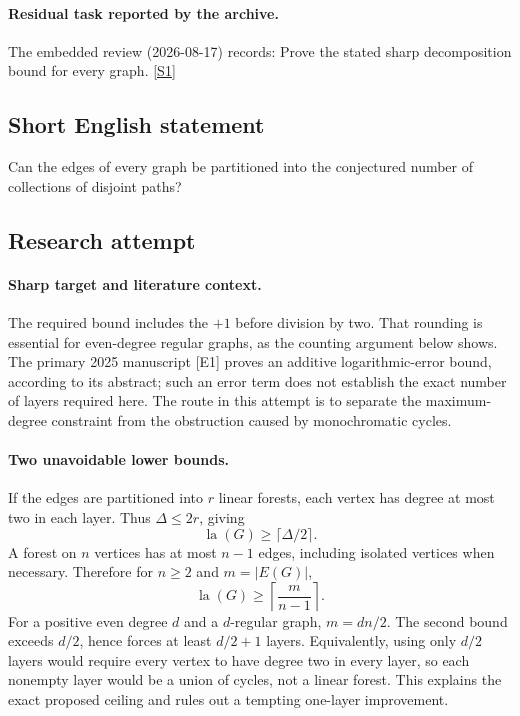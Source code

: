 \documentclass[11pt,a4paper]{article}
\newcommand{\sref}[2]{\hyperlink{source:#1:#2}{[S#2]}}
\begin{document}
\paragraph{Residual task reported by the archive.}

The embedded review (2026-08-17) records: Prove the stated sharp decomposition bound for every graph. \sref{1419}{1}

\subsection{Short English statement}

Can the edges of every graph be partitioned into the conjectured number of collections of disjoint paths?

\subsection{Research attempt}

\paragraph{Sharp target and literature context.}
The required bound includes the $+1$ before division by two. That
rounding is essential for even-degree regular graphs, as the counting
argument below shows. The primary 2025 manuscript [E1] proves an
additive logarithmic-error bound, according to its abstract; such an
error term does not establish the exact number of layers required here.
The route in this attempt is to separate the maximum-degree constraint
from the obstruction caused by monochromatic cycles.

\paragraph{Two unavoidable lower bounds.}
If the edges are partitioned into $r$ linear forests, each vertex has
degree at most two in each layer. Thus $\Delta\le2r$, giving
\[
                  \operatorname{la}(G)\ge\lceil\Delta/2\rceil.
\]
A forest on $n$ vertices has at most $n-1$ edges, including isolated
vertices when necessary. Therefore for $n\ge2$ and $m=|E(G)|$,
\[
                  \operatorname{la}(G)\ge\left\lceil\frac m{n-1}\right\rceil.
\]
For a positive even degree $d$ and a $d$-regular graph, $m=dn/2$.
The second bound exceeds $d/2$, hence forces at least $d/2+1$
layers. Equivalently, using only $d/2$ layers would require every
vertex to have degree two in every layer, so each nonempty layer
would be a union of cycles, not a linear forest. This explains the
exact proposed ceiling and rules out a tempting one-layer improvement.
\end{document}
